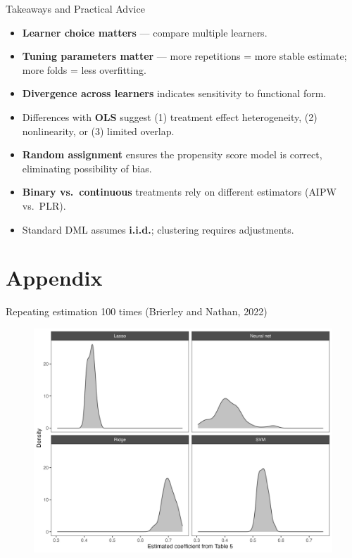 \documentclass[10pt,table,aspectratio=169]{beamer}
\begin{document}
\begin{frame}[plain, label = two_dimensions]{Takeaways and Practical Advice}

\begin{itemize}
  \item \alert{\bf Learner choice matters} --- compare multiple learners.  \medskip \pause
    \item \alert{\bf Tuning parameters matter} --- more repetitions = more stable estimate; more folds = less overfitting.  \medskip \pause
  \item \alert{\bf Divergence across learners} indicates sensitivity to functional form.   \medskip \pause
  \item Differences with \alert{\bf OLS} suggest (1) \alert{treatment effect heterogeneity}, (2) \alert{nonlinearity}, or (3) \alert{limited overlap}.  \medskip \pause
  \item \alert{\bf Random assignment} ensures the propensity score model is correct, eliminating possibility of \alert{bias}. \medskip \pause
  \item \alert{\bf Binary vs.\ continuous} treatments rely on different estimators (\alert{AIPW} vs.\ \alert{PLR}).  \medskip \pause
  \item Standard DML assumes \alert{\bf i.i.d.}; clustering requires adjustments.  
 
\end{itemize}

\end{frame}



\section{Appendix}

\begin{frame}[plain, label = two_dimensions]{Repeating estimation 100 times (Brierley and Nathan, 2022)}

\begin{figure}[H]
  \centering
  \includegraphics[height=0.9\textheight]{figures/observational_density_repeat.png}
\end{figure}
\end{frame}
\end{document}
